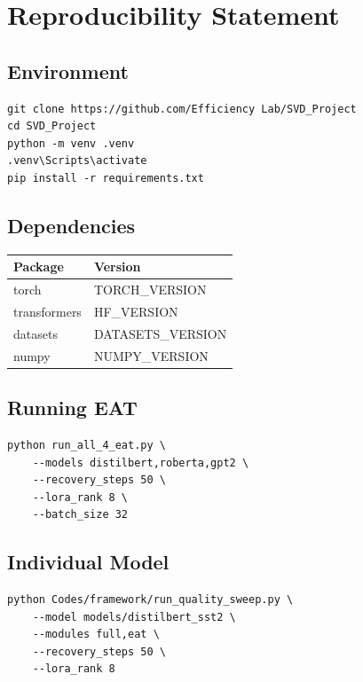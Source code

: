 
\section{Reproducibility Statement}

\subsection{Environment}

\begin{lstlisting}
git clone https://github.com/Efficiency Lab/SVD_Project
cd SVD_Project
python -m venv .venv
.venv\Scripts\activate
pip install -r requirements.txt
\end{lstlisting}

\subsection{Dependencies}

\begin{table}[H]
\centering
\small
\begin{tabular}{ll}
\toprule
\textbf{Package} & \textbf{Version} \\
\midrule
torch & {{TORCH\_VERSION}} \\
transformers & {{HF\_VERSION}} \\
datasets & {{DATASETS\_VERSION}} \\
numpy & {{NUMPY\_VERSION}} \\
\bottomrule
\end{tabular}
\end{table}

\subsection{Running EAT}

\begin{lstlisting}
python run_all_4_eat.py \
    --models distilbert,roberta,gpt2 \
    --recovery_steps 50 \
    --lora_rank 8 \
    --batch_size 32
\end{lstlisting}

\subsection{Individual Model}

\begin{lstlisting}
python Codes/framework/run_quality_sweep.py \
    --model models/distilbert_sst2 \
    --modules full,eat \
    --recovery_steps 50 \
    --lora_rank 8
\end{lstlisting}

